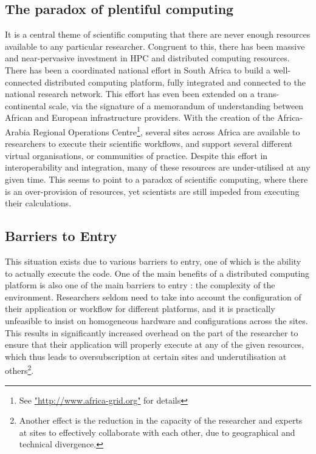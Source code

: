 \documentclass[a4paper]{jpconf}
\begin{document}

	\subsection{The paradox of  plentiful computing}

    It is a central theme of scientific computing that there are never enough resources available to
    any particular researcher. Congruent to this, there has
    been massive and near-pervasive investment in HPC and distributed computing resources. There has
    been a coordinated national effort in South Africa to build a well-connected distributed computing
    platform\cite{SAGrid}, fully integrated and connected to the national research
    network\cite{SANREN}. This effort has even been extended on a trans-continental scale, via the
    signature of a memorandum of understanding between African and European infrastructure
    providers\cite{AAROC}. With the creation of the Africa-Arabia Regional Operations
    Centre\footnote{See \url{"http://www.africa-grid.org"} for details}, several sites across Africa
    are available to researchers to execute their scientific workflows, and support several
    different virtual organisations, or communities of practice. Despite this effort in
    interoperability and integration, many of these resources are under-utilised at any given time.
    This seems to point to a paradox of scientific computing, where there is an over-provision of
    resources, yet scientists are still impeded from executing their calculations.

	\subsection{Barriers to Entry}

    This situation exists due to various barriers to entry, one of which is the ability
    to actually execute the code. One of the main benefits of a distributed computing
    platform is also one of the main barriers to entry : the complexity of the environment.
    Researchers seldom need to take into account the configuration of their application or workflow
    for different platforms, and it is practically unfeasible to insist on homogeneous hardware and
    configurations across the sites. This results in significantly increased overhead on the part of
    the researcher to ensure that their application will properly execute at any of the given
    resources, which thus leads to oversubscription at certain sites and underutilisation at
    others\footnote{Another effect is the reduction in the capacity of the researcher and experts at
    sites to effectively collaborate with each other, due to geographical and technical
    divergence.}.
\end{document}
